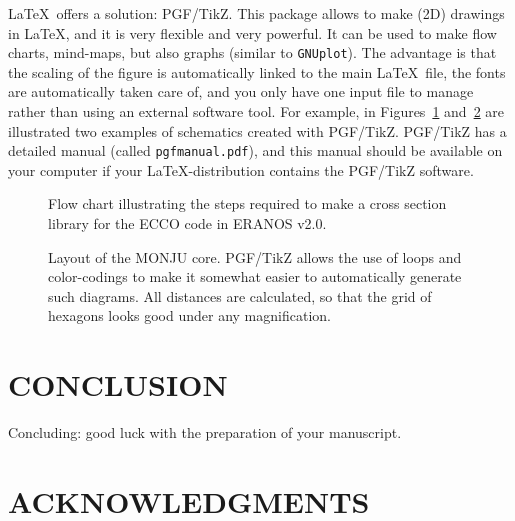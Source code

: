 \documentclass[12pt]{article}
\begin{document}
\LaTeX\  offers a solution: PGF/TikZ. This package allows to make (2D) drawings in \LaTeX, and it is very flexible and very powerful. It can be used to make flow charts, mind-maps, but also graphs (similar to \texttt{GNUplot}). The advantage is that the scaling of the figure is automatically linked to the main \LaTeX\ file, the fonts are automatically taken care of, and you only have one input file to manage rather than using an external software tool. For example, in Figures~\ref{fig::ecco} and~\ref{fig::monju} are illustrated two examples of schematics created with PGF/TikZ. PGF/TikZ has a detailed manual (called \texttt{pgfmanual.pdf}), and this manual should be available on your computer if your \LaTeX-distribution contains the PGF/TikZ software.

\begin{figure}
  \begin{center}
    
    \caption[]{Flow chart illustrating the steps required to make a cross section library for the ECCO code in ERANOS v2.0.}\label{fig::ecco}
  \end{center}
\end{figure}

\begin{figure}
  \begin{center}
    
    \caption[]{Layout of the MONJU core. PGF/TikZ allows the use of loops and color-codings to make it somewhat easier to automatically generate such diagrams. All distances are calculated, so that the grid of hexagons looks good under any magnification.}\label{fig::monju}
  \end{center}
\end{figure}

%
\section{CONCLUSION} 
\label{sect::conclusion}

Concluding: good luck with the preparation of your manuscript.

%
\section*{ACKNOWLEDGMENTS}
\end{document}
